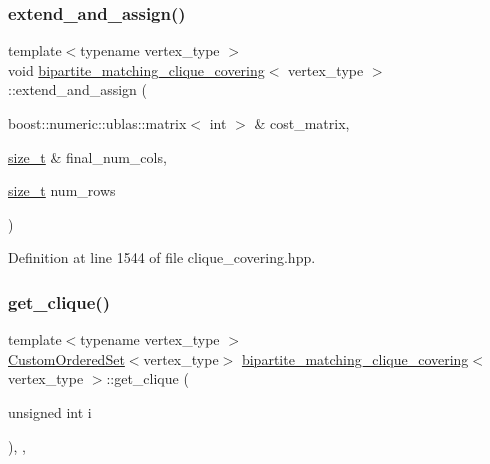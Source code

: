 \subsubsection{\texorpdfstring{extend\+\_\+and\+\_\+assign()}{extend\_and\_assign()}}
{\footnotesize\ttfamily template$<$typename vertex\+\_\+type $>$ \\
void \hyperlink{classbipartite__matching__clique__covering}{bipartite\+\_\+matching\+\_\+clique\+\_\+covering}$<$ vertex\+\_\+type $>$\+::extend\+\_\+and\+\_\+assign (\begin{DoxyParamCaption}\item[{boost\+::numeric\+::ublas\+::matrix$<$ int $>$ \&}]{cost\+\_\+matrix,  }\item[{\hyperlink{tutorial__fpt__2017_2intro_2sixth_2test_8c_a7c94ea6f8948649f8d181ae55911eeaf}{size\+\_\+t} \&}]{final\+\_\+num\+\_\+cols,  }\item[{\hyperlink{tutorial__fpt__2017_2intro_2sixth_2test_8c_a7c94ea6f8948649f8d181ae55911eeaf}{size\+\_\+t}}]{num\+\_\+rows }\end{DoxyParamCaption})\hspace{0.3cm}{\ttfamily [inline]}}



Definition at line 1544 of file clique\+\_\+covering.\+hpp.

\mbox{\label{classbipartite__matching__clique__covering_ad44a38f1e0c81a9e5b534c729eaf7ea7}} 
\subsubsection{\texorpdfstring{get\+\_\+clique()}{get\_clique()}}
{\footnotesize\ttfamily template$<$typename vertex\+\_\+type $>$ \\
\hyperlink{classCustomOrderedSet}{Custom\+Ordered\+Set}$<$vertex\+\_\+type$>$ \hyperlink{classbipartite__matching__clique__covering}{bipartite\+\_\+matching\+\_\+clique\+\_\+covering}$<$ vertex\+\_\+type $>$\+::get\+\_\+clique (\begin{DoxyParamCaption}\item[{unsigned int}]{i }\end{DoxyParamCaption})\hspace{0.3cm}{\ttfamily [inline]}, {\ttfamily [override]}, {\ttfamily [virtual]}}



